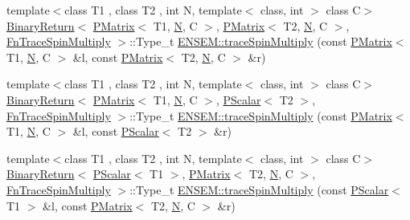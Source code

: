 \begin{DoxyCompactItemize}
\item 
{\footnotesize template$<$class T1 , class T2 , int N, template$<$ class, int $>$ class C$>$ }\\\mbox{\hyperlink{structENSEM_1_1BinaryReturn}{Binary\+Return}}$<$ \mbox{\hyperlink{classENSEM_1_1PMatrix}{P\+Matrix}}$<$ T1, \mbox{\hyperlink{adat__devel_2lib_2hadron_2operator__name__util_8cc_a7722c8ecbb62d99aee7ce68b1752f337}{N}}, C $>$, \mbox{\hyperlink{classENSEM_1_1PMatrix}{P\+Matrix}}$<$ T2, \mbox{\hyperlink{adat__devel_2lib_2hadron_2operator__name__util_8cc_a7722c8ecbb62d99aee7ce68b1752f337}{N}}, C $>$, \mbox{\hyperlink{structENSEM_1_1FnTraceSpinMultiply}{Fn\+Trace\+Spin\+Multiply}} $>$\+::Type\+\_\+t \mbox{\hyperlink{group__primmatrix_gabc920df179ac4bd2438224848ec237af}{E\+N\+S\+E\+M\+::trace\+Spin\+Multiply}} (const \mbox{\hyperlink{classENSEM_1_1PMatrix}{P\+Matrix}}$<$ T1, \mbox{\hyperlink{adat__devel_2lib_2hadron_2operator__name__util_8cc_a7722c8ecbb62d99aee7ce68b1752f337}{N}}, C $>$ \&l, const \mbox{\hyperlink{classENSEM_1_1PMatrix}{P\+Matrix}}$<$ T2, \mbox{\hyperlink{adat__devel_2lib_2hadron_2operator__name__util_8cc_a7722c8ecbb62d99aee7ce68b1752f337}{N}}, C $>$ \&r)
\item 
{\footnotesize template$<$class T1 , class T2 , int N, template$<$ class, int $>$ class C$>$ }\\\mbox{\hyperlink{structENSEM_1_1BinaryReturn}{Binary\+Return}}$<$ \mbox{\hyperlink{classENSEM_1_1PMatrix}{P\+Matrix}}$<$ T1, \mbox{\hyperlink{adat__devel_2lib_2hadron_2operator__name__util_8cc_a7722c8ecbb62d99aee7ce68b1752f337}{N}}, C $>$, \mbox{\hyperlink{classENSEM_1_1PScalar}{P\+Scalar}}$<$ T2 $>$, \mbox{\hyperlink{structENSEM_1_1FnTraceSpinMultiply}{Fn\+Trace\+Spin\+Multiply}} $>$\+::Type\+\_\+t \mbox{\hyperlink{group__primmatrix_gab5fbf23688b38c3209c80d2a9a22b3d0}{E\+N\+S\+E\+M\+::trace\+Spin\+Multiply}} (const \mbox{\hyperlink{classENSEM_1_1PMatrix}{P\+Matrix}}$<$ T1, \mbox{\hyperlink{adat__devel_2lib_2hadron_2operator__name__util_8cc_a7722c8ecbb62d99aee7ce68b1752f337}{N}}, C $>$ \&l, const \mbox{\hyperlink{classENSEM_1_1PScalar}{P\+Scalar}}$<$ T2 $>$ \&r)
\item 
{\footnotesize template$<$class T1 , class T2 , int N, template$<$ class, int $>$ class C$>$ }\\\mbox{\hyperlink{structENSEM_1_1BinaryReturn}{Binary\+Return}}$<$ \mbox{\hyperlink{classENSEM_1_1PScalar}{P\+Scalar}}$<$ T1 $>$, \mbox{\hyperlink{classENSEM_1_1PMatrix}{P\+Matrix}}$<$ T2, \mbox{\hyperlink{adat__devel_2lib_2hadron_2operator__name__util_8cc_a7722c8ecbb62d99aee7ce68b1752f337}{N}}, C $>$, \mbox{\hyperlink{structENSEM_1_1FnTraceSpinMultiply}{Fn\+Trace\+Spin\+Multiply}} $>$\+::Type\+\_\+t \mbox{\hyperlink{group__primmatrix_gafb9febbc048f38bb6e1dc7d60d8dde8d}{E\+N\+S\+E\+M\+::trace\+Spin\+Multiply}} (const \mbox{\hyperlink{classENSEM_1_1PScalar}{P\+Scalar}}$<$ T1 $>$ \&l, const \mbox{\hyperlink{classENSEM_1_1PMatrix}{P\+Matrix}}$<$ T2, \mbox{\hyperlink{adat__devel_2lib_2hadron_2operator__name__util_8cc_a7722c8ecbb62d99aee7ce68b1752f337}{N}}, C $>$ \&r)

\end{DoxyCompactItemize}
